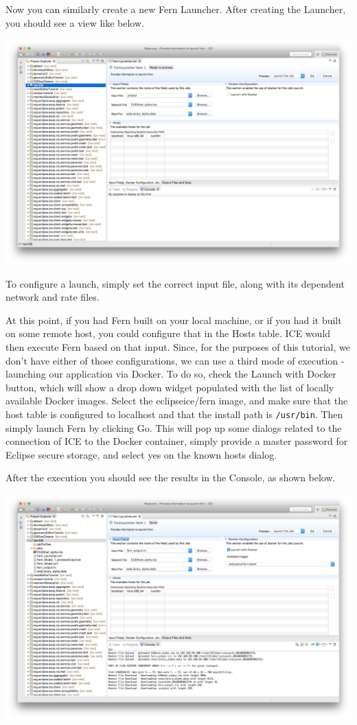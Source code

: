 Now you can similarly create a new Fern Launcher. After creating the Launcher,
you should see a view like below. 
\begin{center} \includegraphics[width=\textwidth]{figures/launcher}
\end{center}
To configure a launch, simply set the correct
input file, along with its dependent network and rate files. 

At this point, if you had Fern built on your local machine, or if you had it
built on some remote host, you could configure that in the Hosts table. ICE
would then execute Fern based on that input. Since, for the purposes of this
tutorial, we don't have either of those configurations, we can use a third mode
of execution - launching our application via Docker. To do so, check the Launch
with Docker button, which will show a drop down widget populated with the list
of locally available Docker images. Select the eclipseice/fern image, and make
sure that the host table is configured to localhost and that the install path is
\texttt{/usr/bin}. Then simply launch Fern by clicking Go. This will pop up some
dialogs related to the connection of ICE to the Docker container, simply provide
a master password for Eclipse secure storage, and select yes on the known hosts
dialog. 

After the execution you should see the results in the Console, as shown below.
\begin{center} \includegraphics[width=\textwidth]{figures/launcherResult}
\end{center}